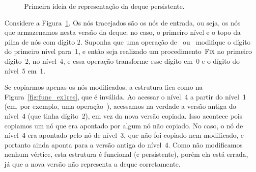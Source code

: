 \documentclass[../../main.tex]{subfiles}
\begin{document}
\begin{figure}[h]
\centering
{}
\caption{Primeira ideia de representação da deque persistente.} \label{fig:func_ex1}
\end{figure}

Considere a Figura~\ref{fig:func_ex1}. Os nós tracejados são os nós de entrada, ou seja, os nós que armazenamos nesta versão da deque; no caso, o primeiro nível e o topo da pilha de nós com dígito 2. Suponha que uma operação de~ ou~ modifique o dígito do primeiro nível para~1, e então seja realizado um procedimento~\textsc{Fix} no primeiro dígito~2, no nível~4, e essa operação transforme esse dígito em~0 e o dígito do nível~5 em~1.

Se copiarmos apenas os nós modificados, a estrutura fica como na Figura~\ref{fig:func_ex1res}, que é inválida. Ao acessar o nível~4 a partir do nível~1 (em, por exemplo, uma operação~), acessamos na verdade a versão antiga do nível~4 (que tinha dígito~2), em vez da nova versão copiada. Isso acontece pois copiamos um nó que era apontado por algum nó não copiado. No caso, o nó de nível~4 era apontado pelo nó de nível~3, que não foi copiado nem modificado, e portanto ainda aponta para a versão antiga do nível~4. Como não modificamos nenhum vértice, esta estrutura é funcional (e persistente), porém ela está errada, já que a nova versão não representa a deque corretamente.
\end{document}
